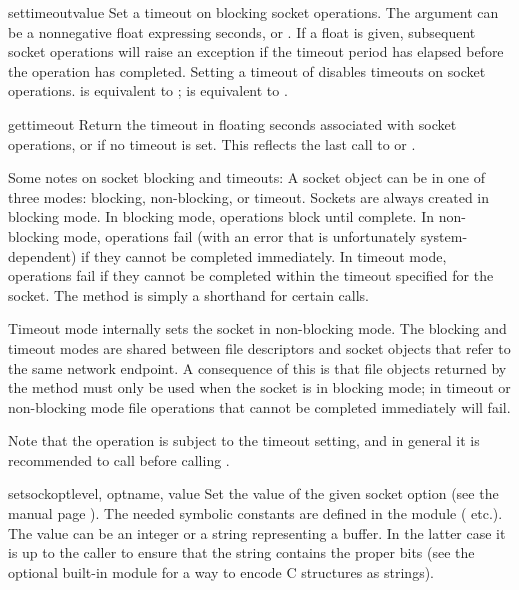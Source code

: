 \begin{methoddesc}[socket]{settimeout}{value}
Set a timeout on blocking socket operations.  The  argument
can be a nonnegative float expressing seconds, or .
If a float is
given, subsequent socket operations will raise an 
exception if the timeout period  has elapsed before the
operation has completed.  Setting a timeout of  disables
timeouts on socket operations.
 is equivalent to ;
 is equivalent to .
\end{methoddesc}

\begin{methoddesc}[socket]{gettimeout}{}
Return the timeout in floating seconds associated with socket
operations, or  if no timeout is set.  This reflects
the last call to  or .
\end{methoddesc}

Some notes on socket blocking and timeouts: A socket object can be in
one of three modes: blocking, non-blocking, or timeout.  Sockets are
always created in blocking mode.  In blocking mode, operations block
until complete.  In non-blocking mode, operations fail (with an error
that is unfortunately system-dependent) if they cannot be completed
immediately.  In timeout mode, operations fail if they cannot be
completed within the timeout specified for the socket.  The
 method is simply a shorthand for certain
 calls.

Timeout mode internally sets the socket in non-blocking mode.  The
blocking and timeout modes are shared between file descriptors and
socket objects that refer to the same network endpoint.  A consequence
of this is that file objects returned by the 
method must only be used when the socket is in blocking mode; in
timeout or non-blocking mode file operations that cannot be completed
immediately will fail.

Note that the  operation is subject to the timeout
setting, and in general it is recommended to call
 before calling .

\begin{methoddesc}[socket]{setsockopt}{level, optname, value}
Set the value of the given socket option (see the \UNIX{} manual page
).  The needed symbolic constants are defined in
the  module ( etc.).  The value can be an
integer or a string representing a buffer.  In the latter case it is
up to the caller to ensure that the string contains the proper bits
(see the optional built-in module
 for a way to encode C
structures as strings). 
\end{methoddesc}

